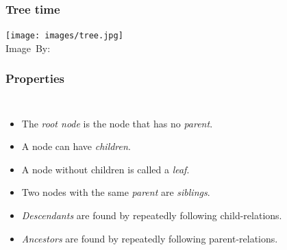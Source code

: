 \begin{frame}
	\frametitle{Tree time}
	\begin{center}
		\texttt{[image: images/tree.jpg]}\\
		\hspace*{15pt}\hbox{\scriptsize Image By:}
	\end{center}
\end{frame}

\begin{frame}
	\frametitle{Properties}
	\begin{columns}
		\begin{itemize}
			\item The \textit{root node} is the node that has no \textit{parent}.
				\pause
			\item A node can have \textit{children}.
				\pause
			\item A node without children is called a \textit{leaf}.
				\pause
			\item Two nodes with the same \textit{parent} are \textit{siblings}.
				\pause
			\item \textit{Descendants} are found by repeatedly following child-relations.
				\pause
			\item \textit{Ancestors} are found by repeatedly following parent-relations.
		\end{itemize}
	\end{columns}
\end{frame}

